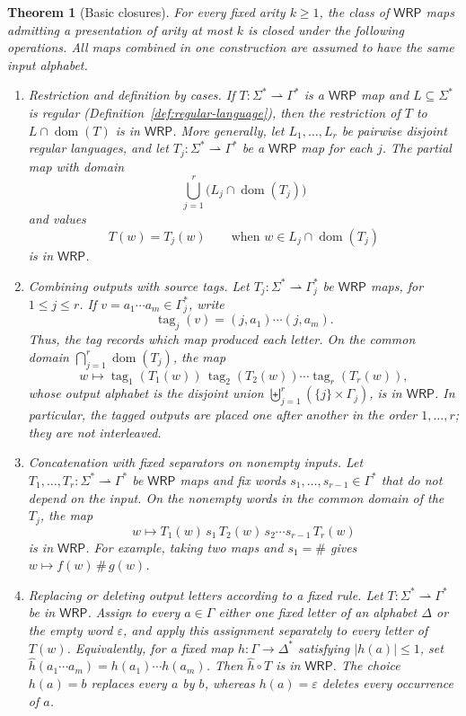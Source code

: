 \documentclass[11pt]{article}
\newtheorem{theorem}{Theorem}[section]
\theoremstyle{definition}
\newcommand{\WRP}{\mathsf{WRP}}
\begin{document}
\begin{theorem}[Basic closures]\label{thm:wrp-closures}
For every fixed arity $k\ge 1$, the class of $\WRP$ maps admitting a
presentation of arity at most $k$ is closed under the following operations.
All maps combined in one construction are assumed to have the same input
alphabet.
\begin{enumerate}[label=(\roman*)]
\item \emph{Restriction and definition by cases.}
If $T\colon\Sigma^*\rightharpoonup\Gamma^*$ is a $\WRP$ map and
$L\subseteq\Sigma^*$ is regular (Definition~\ref{def:regular-language}), then
the restriction of $T$ to $L\cap\operatorname{dom}(T)$ is in $\WRP$.
More generally, let $L_1,\ldots,L_r$ be pairwise disjoint regular languages,
and let $T_j\colon\Sigma^*\rightharpoonup\Gamma^*$ be a $\WRP$ map for each
$j$.  The partial map with domain
\[
   \bigcup_{j=1}^r\bigl(L_j\cap\operatorname{dom}(T_j)\bigr)
\]
and values
\[
   T(w)=T_j(w)\qquad
   \text{when }w\in L_j\cap\operatorname{dom}(T_j)
\]
is in $\WRP$.

\item \emph{Combining outputs with source tags.}
Let $T_j\colon\Sigma^*\rightharpoonup\Gamma_j^*$ be $\WRP$ maps, for
$1\le j\le r$.  If $v=a_1\cdots a_m\in\Gamma_j^*$, write
\[
   \operatorname{tag}_j(v)=(j,a_1)\cdots(j,a_m).
\]
Thus, the tag records which map produced each letter.  On the common domain
$\bigcap_{j=1}^r\operatorname{dom}(T_j)$, the map
\[
   w\longmapsto
   \operatorname{tag}_1(T_1(w))\,
   \operatorname{tag}_2(T_2(w))\cdots
   \operatorname{tag}_r(T_r(w)),
\]
whose output alphabet is the disjoint union
$\biguplus_{j=1}^r(\{j\}\times\Gamma_j)$, is in $\WRP$.  In particular, the
tagged outputs are placed one after another in the order $1,\ldots,r$; they
are not interleaved.

\item \emph{Concatenation with fixed separators on nonempty inputs.}
Let $T_1,\ldots,T_r\colon\Sigma^*\rightharpoonup\Gamma^*$ be $\WRP$ maps and
fix words $s_1,\ldots,s_{r-1}\in\Gamma^*$ that do not depend on the input.
On the nonempty words in the common domain of the $T_j$, the map
\[
   w\longmapsto
   T_1(w)\,s_1\,T_2(w)\,s_2\cdots s_{r-1}\,T_r(w)
\]
is in $\WRP$.  For example, taking two maps and $s_1=\#$ gives
$w\mapsto f(w)\,\#\,g(w)$.

\item \emph{Replacing or deleting output letters according to a fixed rule.}
Let $T\colon\Sigma^*\rightharpoonup\Gamma^*$ be in $\WRP$.  Assign to every
$a\in\Gamma$ either one fixed letter of an alphabet $\Delta$ or the empty word
$\varepsilon$, and apply this assignment separately to every letter of
$T(w)$.  Equivalently, for a fixed map $h\colon\Gamma\to\Delta^*$ satisfying
$|h(a)|\le 1$, set
$\widehat h(a_1\cdots a_m)=h(a_1)\cdots h(a_m)$.
Then $\widehat h\circ T$ is in $\WRP$.  The choice $h(a)=b$ replaces every
$a$ by $b$, whereas $h(a)=\varepsilon$ deletes every occurrence of $a$.


\end{enumerate}
\end{theorem}
\end{document}
